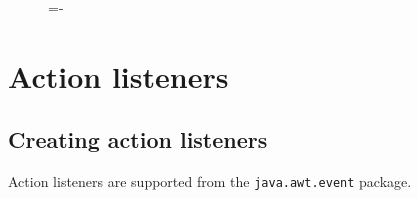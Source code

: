 \documentclass[a4paper]{systems-software}
\begin{document}
\begin{figure}[H]
	\lineskip=-\fboxrule
\end{figure}


\section{Action listeners}

\subsection*{Creating action listeners}

Action listeners are supported from the \texttt{java.awt.event} package.
\end{document}
